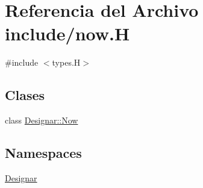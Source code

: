 \hypertarget{now_8_h}{}\section{Referencia del Archivo include/now.H}
\label{now_8_h}
{\ttfamily \#include $<$types.\+H$>$}\newline
\subsection*{Clases}
\begin{DoxyCompactItemize}
\item 
class \hyperlink{class_designar_1_1_now}{Designar\+::\+Now}
\end{DoxyCompactItemize}
\subsection*{Namespaces}
\begin{DoxyCompactItemize}
\item 
 \hyperlink{namespace_designar}{Designar}
\end{DoxyCompactItemize}
